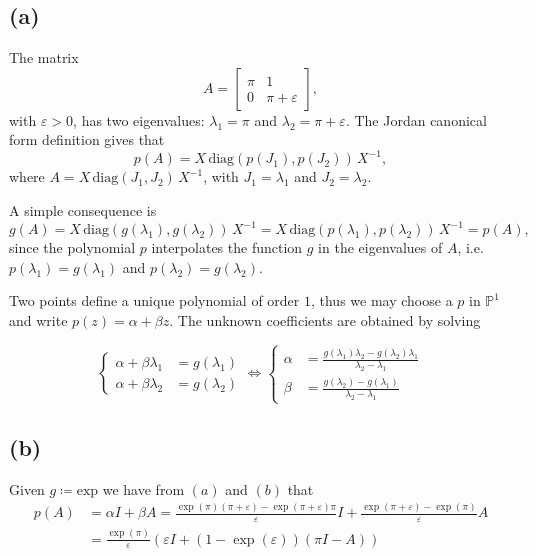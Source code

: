 \subsection*{(a)}
The matrix
\begin{equation}
  A = \begin{bmatrix}
    \pi & 1 \\
    0 & \pi + \varepsilon
  \end{bmatrix},
\end{equation}
with $\varepsilon > 0$, has two eigenvalues: $\lambda_{1} = \pi$ and $\lambda_{2} = \pi+\varepsilon$. The Jordan canonical form definition gives that
\begin{equation}
  p(A) = X\, \text{diag}(p(J_{1}),p(J_{2}))\,X^{-1},
\end{equation}
where $A = X\, \text{diag}(J_{1},J_{2})\,X^{-1}$, with $J_{1} = \lambda_{1}$ and $J_{2} = \lambda_{2}$.


 A simple consequence is
\begin{equation}
  g(A) = X\, \text{diag}(g(\lambda_{1}),g(\lambda_{2}))\,X^{-1} = X\, \text{diag}(p(\lambda_{1}),p(\lambda_{2}))\,X^{-1} = p(A),
\end{equation}
since the polynomial $p$ interpolates the function $g$ in the eigenvalues of $A$, i.e. $p(\lambda_{1}) = g(\lambda_{1})$ and $p(\lambda_{2}) = g(\lambda_{2})$.

Two points define a unique polynomial of order $1$, thus we may choose a $p$ in $\mathbb{P}^{1}$ and write $p(z) = \alpha + \beta z$. The unknown coefficients are obtained by solving

\begin{equation}
  \begin{cases}
    \alpha + \beta \lambda_{1} &= g(\lambda_{1})\\
    \alpha + \beta \lambda_{2} &= g(\lambda_{2})
  \end{cases}
  \Leftrightarrow
   \begin{cases}
    \alpha  &= \frac{g(\lambda_{1})\lambda_{2}-g(\lambda_{2})\lambda_{1}}{\lambda_{2}-\lambda_{1}}\\
    \beta  &= \frac{g(\lambda_{2})-g(\lambda_{1})}{\lambda_{2}-\lambda_{1}}
  \end{cases}
\end{equation}


\subsection*{(b)}
Given $g\coloneqq \text{exp}$ we have from $(a)$ and $(b)$ that
\begin{align}
  \label{eq:task6exp}
  p(A)  &= \alpha I + \beta A = \frac{\exp{(\pi)}(\pi + \varepsilon)-\exp{(\pi + \varepsilon)}\pi}{\varepsilon} I + \frac{\exp{(\pi + \varepsilon)}-\exp{(\pi)}}{\varepsilon}A \\
  &= \frac{\exp(\pi)}{\varepsilon}(\varepsilon I+(1 - \exp{(\varepsilon)})(\pi I -A))
\end{align}
